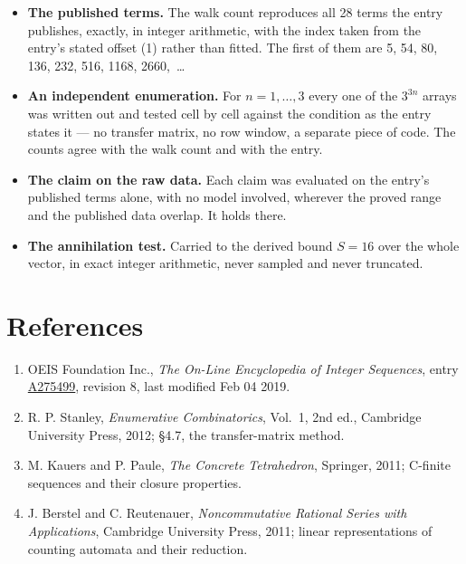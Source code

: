 \documentclass[11pt]{article}
\theoremstyle{definition}
\begin{document}
\begin{itemize}

\item {\bfseries The published terms.} The walk count reproduces all 28 terms the entry publishes, exactly, in integer arithmetic, with the index taken from the entry's stated offset (1) rather than fitted. The first of them are 5, 54, 80, 136, 232, 516, 1168, 2660,~\dots

\item {\bfseries An independent enumeration.} For $n = 1,\dots,3$ every one of the $3^{3n}$ arrays was written out and tested cell by cell against the condition as the entry states it --- no transfer matrix, no row window, a separate piece of code. The counts agree with the walk count and with the entry.

\item {\bfseries The claim on the raw data.} Each claim was evaluated on the entry's published terms alone, with no model involved, wherever the proved range and the published data overlap. It holds there.

\item {\bfseries The annihilation test.} Carried to the derived bound $S = 16$ over the whole vector, in exact integer arithmetic, never sampled and never truncated.

\end{itemize}

\section{References}

\begin{enumerate}

\item OEIS Foundation Inc., \emph{The On-Line Encyclopedia of Integer Sequences}, entry \href{https://oeis.org/A275499}{A275499}, revision 8, last modified Feb 04 2019.

\item R. P. Stanley, \emph{Enumerative Combinatorics}, Vol.~1, 2nd ed., Cambridge University Press, 2012; \S4.7, the transfer-matrix method.

\item M. Kauers and P. Paule, \emph{The Concrete Tetrahedron}, Springer, 2011; C-finite sequences and their closure properties.

\item J. Berstel and C. Reutenauer, \emph{Noncommutative Rational Series with Applications}, Cambridge University Press, 2011; linear representations of counting automata and their reduction.

\end{enumerate}
\end{document}
